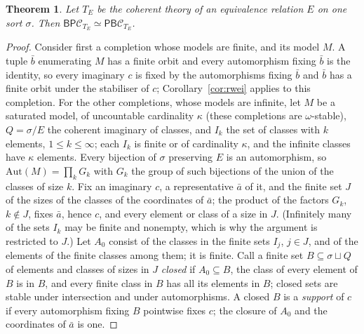 \documentclass[11pt]{amsart}
\newtheorem{thm}{Theorem}[section]
\theoremstyle{definition}
\newcommand{\PP}{\mathsf P}
\newcommand{\BB}{\mathsf B}
\newcommand{\cC}{\mathcal C}
\begin{document}
\begin{thm}\label{thm:eqrel}
Let $T_E$ be the coherent theory of an equivalence relation $E$ on one
sort $\sigma$. Then $\BB\PP\cC_{T_E}\simeq\PP\BB\cC_{T_E}$.
\end{thm}
\begin{proof}
Consider first a completion whose models are finite, and its model $M$.
A tuple $\bar b$ enumerating $M$ has a finite orbit and every
automorphism fixing $\bar b$ is the identity, so every imaginary $c$ is
fixed by the automorphisms fixing $\bar b$ and $\bar b$ has a finite
orbit under the stabiliser of $c$; Corollary~\ref{cor:rwei} applies to
this completion. For the other completions, whose models are
infinite, let
$M$ be a saturated model, of uncountable
cardinality $\kappa$ (these completions are $\omega$-stable),
$Q=\sigma/E$ the coherent imaginary of classes, and $I_k$ the set of
classes with $k$ elements, $1\le k\le\infty$; each $I_k$ is finite or of
cardinality $\kappa$, and the infinite classes have $\kappa$ elements.
Every bijection of $\sigma$ preserving $E$ is an automorphism, so
$\mathrm{Aut}(M)=\prod_kG_k$ with $G_k$ the group of such bijections of
the union of the classes of size $k$. Fix an imaginary $c$, a
representative $\bar a$ of it, and the finite set $J$ of the sizes of
the classes of the coordinates of $\bar a$; the product of the factors
$G_k$, $k\notin J$, fixes $\bar a$, hence $c$, and every element or
class of a size in $J$. (Infinitely many of the sets
$I_k$ may be finite and nonempty, which is why the argument is
restricted to $J$.) Let $A_0$ consist of the classes in the finite sets
$I_j$, $j\in J$, and of the elements of the finite classes among them;
it is finite. Call a finite set $B\subseteq\sigma\sqcup Q$ of elements
and classes of sizes in $J$ \emph{closed} if $A_0\subseteq B$, the class
of every element of $B$ is in $B$, and every finite class in $B$ has all
its elements in $B$; closed sets are stable under intersection and
under automorphisms. A closed $B$ is a \emph{support} of $c$ if every
automorphism fixing $B$ pointwise fixes $c$; the closure of $A_0$ and
the coordinates of $\bar a$ is one.


\end{proof}
\end{document}
